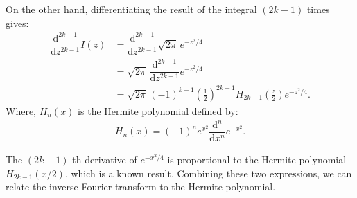 \documentclass[a4paper,12pt]{article}
\newcommand{\dd}{\mathrm{d}}
\newcommand{\diff}[2]{\dfrac{\dd #1}{\dd #2}}
\begin{document}
  On the other hand, differentiating the result of the integral $(2k-1)$ times gives:
  \begin{align*}
    \diff{^{2k-1}}{z^{2k-1}} I(z) &= \diff{^{2k-1}}{z^{2k-1}} \sqrt{2\pi} \, e^{-z^2/4} \\
    &= \sqrt{2\pi} \, \diff{^{2k-1}}{z^{2k-1}} e^{-z^2/4} \\
    &= \sqrt{2\pi} \, (-1)^{k-1} \left(\frac{1}{2}\right)^{2k-1} H_{2k-1}\left(\frac{z}{2}\right) e^{-z^2/4}. 
  \end{align*}
  Where, $H_n(x)$ is the Hermite polynomial defined by:
  \begin{align}
    H_n(x) = (-1)^n e^{x^2} \diff{^n}{x^n} e^{-x^2}.
  \end{align}

  The $(2k-1)$-th derivative of $e^{-x^2/4}$ is proportional to the Hermite polynomial $H_{2k-1}(x/2)$, which is a known result. Combining these two expressions, we can relate the inverse Fourier transform to the Hermite polynomial.

\clearpage

\nocite{*} 
 
 
\end{document}
